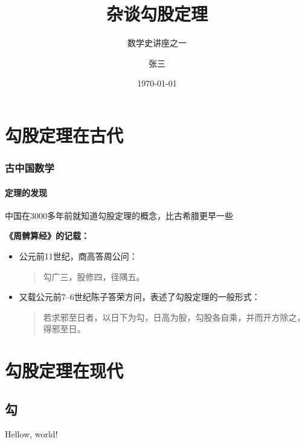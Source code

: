 \documentclass{beamer}
\title{杂谈勾股定理}
\subtitle{数学史讲座之一}
\institute{九章学堂}
\author{张三}
\date{\today}
\begin{document}
	\begin{frame}
		\titlepage	
	\end{frame}

	\begin{frame}
		\tableofcontents[pausesections] %
	\end{frame}

	\section{勾股定理在古代} %
	

		\begin{frame}
			\sectionpage
		\end{frame}

		\begin{frame}
			\frametitle{古中国数学}
			\framesubtitle{定理的发现}
			\alert<2->{中国在3000多年前就知道勾股定理的概念，比古希腊更早一些}	%
			\pause %

			\textbf<3->{《周髀算经》的记载：}	%
			\pause
			\begin{itemize}
				\item<+-| alert@+-> 公元前11世纪，商高答周公问：
				\begin{quote}
					勾广三，股修四，径隅五。
				\end{quote}
				\item<+-> 又载公元前7--6世纪陈子答荣方问，表述了勾股定理的一般形式：
				\begin{quote}
					若求邪至日者，以日下为勾，日高为股，勾股各自乘，并而开方除之，得邪至日。
				\end{quote}
			\end{itemize}
		\end{frame}
	
	
	\section{勾股定理在现代}

		\begin{frame}
			\sectionpage
		\end{frame}

		\begin{frame}
			\tableofcontents[currentsection]
		\end{frame}

		 	\subsection{勾} %
		 		\begin{frame}
		 			Hellow, world!
		 		\end{frame}
\end{document}

